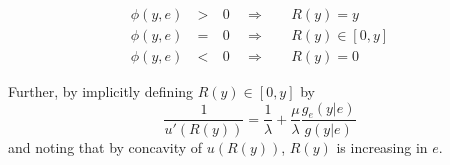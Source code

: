 \begin{subequations}
\label{eq:KT-analysis-ra}
\begin{alignat}{3}
    \phi(y,e) & \: > \: & 0 & \enspace \Rightarrow & & \enspace R(y)=y \label{subeq:large-y-ra}\\
    \phi(y,e) & \: = \: & 0 & \enspace \Rightarrow & & \enspace R(y)\in [0,y] \label{subeq:interval-y-ra} \\
    \phi(y,e) & \: < \: & 0 & \enspace \Rightarrow & & \enspace R(y) =0 \label{subeq:small-y-ra}
\end{alignat}
\end{subequations}

Further, by implicitly defining $R(y)\in[0,y]$ by 
\[
    \frac{1}{u'(R(y))}=\frac{1}{\lambda}+\frac{\mu}{\lambda}\frac{g_e(y|e)}{g(y|e)}
\]
and noting that by concavity of $u(R(y))$, $R(y)$ is increasing in $e$. 
\printbibliography%
\listoftodos%
